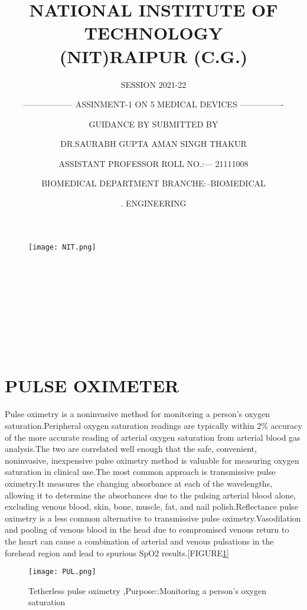 \documentclass[12pt]{article}
\title{NATIONAL INSTITUTE OF TECHNOLOGY\\
(NIT)RAIPUR (C.G.)}
\author {SESSION 2021-22}
\date{}
\begin{document}
\maketitle
\begin{figure}[h]
\centering
\texttt{[image: NIT.png]}
\end{figure}
\author {------------------ ASSINMENT-1 ON  {5 MEDICAL DEVICES} ----------------}\\


\author{GUIDANCE BY \>  \>\> \>\> \>  \>\> \>\> \>\>  \>\>\>\>  \>\> \>\>\>  \>\> \>\> \>  \>\> \>\>   \>\> \>\>  SUBMITTED BY }\\


\author{DR.SAURABH GUPTA\>  \>\> \>\> \>  \>\> \>\>\>\>\>  \>\> \>\>\>  \>\> \>\> \>  \>\> AMAN SINGH THAKUR }\\

\author{ ASSISTANT PROFESSOR\>  \>\> \>  \> \>   \>\> \>\> \> \>\> \> \>\> \>  ROLL NO.:--- 21111008 }\\
\author{BIOMEDICAL DEPARTMENT\>  \>\> \>\> \>  \>\> \>\> \>\>   \>\> BRANCHE:--BIOMEDICAL  }\\
\author{.\>   \>\> \>\> \>  \>\> \>\> \>\> \>\> \>\> \>  \>\> \>\> \>\>\>\> \>\> \>\>  \>\> \>\> \>\> \>\>\> \>\> \>   \>\> \>\> \>\> \>\>\> \>\> \>    \>\> \>\> \>\> \>\> \>\> \>  \>\> \>\> \>\>  \>\> ENGINEERING }
\clearpage
\tableofcontents
\clearpage
\section{ PULSE OXIMETER}

Pulse oximetry is a noninvasive method for monitoring a person's oxygen saturation.Peripheral oxygen saturation readings are typically within 2\% accuracy of the more accurate reading of arterial oxygen saturation from arterial blood gas analysis.The two are correlated well enough that the safe, convenient, noninvasive, inexpensive pulse oximetry method is valuable for measuring oxygen saturation in clinical use.The most common approach is transmissive pulse oximetry.It measures the changing absorbance at each of the wavelengths, allowing it to determine the absorbances due to the pulsing arterial blood alone, excluding venous blood, skin, bone, muscle, fat, and nail polish.Reflectance pulse oximetry is a less common alternative to transmissive pulse oximetry.Vasodilation and pooling of venous blood in the head due to compromised venous return to the heart can cause a combination of arterial and venous pulsations in the forehead region and lead to spurious SpO2 results.[FIGURE\ref{fig_PUL}]
\begin{figure}[h]
\centering
\texttt{[image: PUL.png]}
\caption{Tetherless pulse oximetry
,Purpose::Monitoring a person's oxygen saturation}
\label{fig_PUL}
\end{figure}
\end{document}
